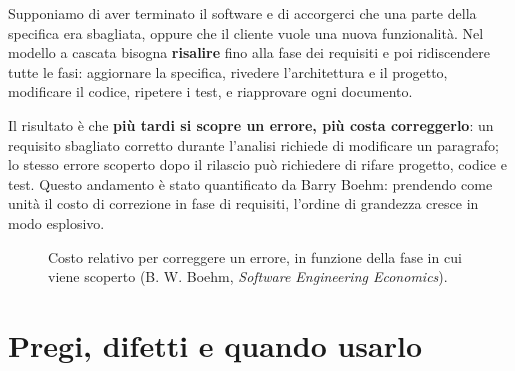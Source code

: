 Supponiamo di aver terminato il software e di accorgerci che una parte della specifica era sbagliata, oppure che il cliente vuole
una nuova funzionalità. Nel modello a cascata bisogna \textbf{risalire} fino alla fase dei requisiti e poi ridiscendere tutte le fasi:
aggiornare la specifica, rivedere l'architettura e il progetto, modificare il codice, ripetere i test, e riapprovare ogni documento.

Il risultato è che \textbf{più tardi si scopre un errore, più costa correggerlo}: un requisito sbagliato corretto durante l'analisi
richiede di modificare un paragrafo; lo stesso errore scoperto dopo il rilascio può richiedere di rifare progetto, codice e test.
Questo andamento è stato quantificato da Barry Boehm: prendendo come unità il costo di correzione in fase di requisiti, l'ordine di
grandezza cresce in modo esplosivo.

\begin{figure}[H]
\centering
{}
\caption{Costo relativo per correggere un errore, in funzione della fase in cui viene scoperto (B. W. Boehm, \textit{Software Engineering Economics}).}
\end{figure}


\section{Pregi, difetti e quando usarlo}

